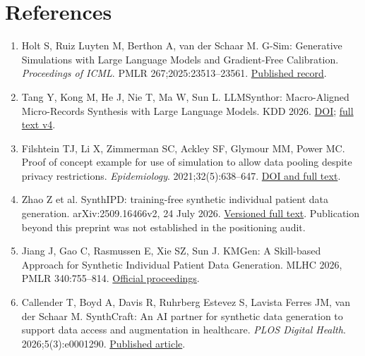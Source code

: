 \documentclass[11pt,letterpaper]{article}
\begin{document}
\clearpage

\section*{References}

\begingroup

\begin{enumerate}[label=\arabic*.,leftmargin=2.1em,itemsep=.2em,parsep=0pt]

\item Holt S, Ruiz Luyten M, Berthon A, van der Schaar M. G-Sim: Generative Simulations with Large Language Models and Gradient-Free Calibration. \emph{Proceedings of ICML}. PMLR 267;2025:23513–\allowbreak{}23561. \href{https://proceedings.mlr.press/v267/holt25b.html}{Published record}.

\item Tang Y, Kong M, He J, Nie T, Ma W, Sun L. LLMSynthor: Macro-Aligned Micro-Records Synthesis with Large Language Models. KDD 2026. \href{https://doi.org/10.1145/3770855.3818965}{DOI}; \href{https://arxiv.org/html/2505.14752v4}{full text v4}.

\item Filshtein TJ, Li X, Zimmerman SC, Ackley SF, Glymour MM, Power MC. Proof of concept example for use of simulation to allow data pooling despite privacy restrictions. \emph{Epidemiology}. 2021;32(5):638–\allowbreak{}647. \href{https://pmc.ncbi.nlm.nih.gov/articles/PMC8338788/}{DOI and full text}.

\item Zhao Z et al. SynthIPD: training-free synthetic individual patient data generation. arXiv:2509.16466v2, 24 July 2026. \href{https://arxiv.org/html/2509.16466v2}{Versioned full text}. Publication beyond this preprint was not established in the positioning audit.

\item Jiang J, Gao C, Rasmussen E, Xie SZ, Sun J. KMGen: A Skill-based Approach for Synthetic Individual Patient Data Generation. MLHC 2026, PMLR 340:755–\allowbreak{}814. \href{https://proceedings.mlr.press/v340/jiang26a.html}{Official proceedings}.

\item Callender T, Boyd A, Davis R, Ruhrberg Estevez S, Lavista Ferres JM, van der Schaar M. SynthCraft: An AI partner for synthetic data generation to support data access and augmentation in healthcare. \emph{PLOS Digital Health}. 2026;5(3):e0001290. \href{https://journals.plos.org/digitalhealth/article?id=10.1371/journal.pdig.0001290}{Published article}.


\end{enumerate}
\end{document}
